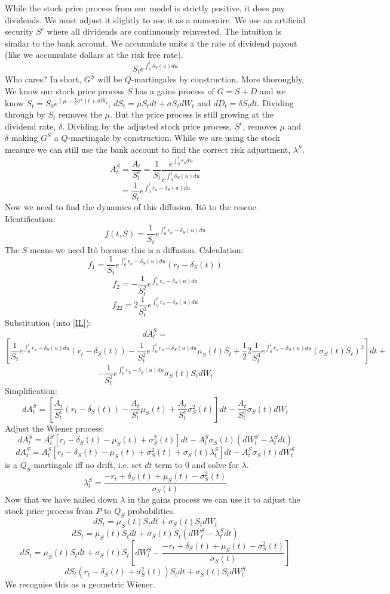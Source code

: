 While the stock price process from our model is strictly positive, it does pay
dividends. We must adjust it slightly to use it as a numeraire. We use an
artificial security $S^c$ where all dividends are continuously reinvested. The
intuition is similar to the bank account. We accumulate units a the rate of
dividend payout (like we accumulate dollars at the risk free rate).
\begin{equation} \label{stockNumeraire}
  S_te^{\int_0^t\delta_S(u)du}
\end{equation}
Who cares? In short, $G^S$ will be $Q$-martingales by construction. More
thoroughly, We know our stock price process $S$ has a gains process of
$G=S+D$ and we know $S_t=S_0e^{\left(\mu-\frac{1}{2}\sigma^2\right) t+
\sigma W_t}$, $dS_t=\mu S_tdt+\sigma S_tdW_t$ and $dD_t=\delta S_tdt$.
Dividing through by $S_t$ removes the $\mu$. But the price process is still
growing at the dividend rate, $\delta$. Dividing by the adjusted stock price
process, $S^c$, removes $\mu$ and $\delta$ making $G^S$ a $Q$-martingale by
construction. 
While we are using the stock measure we can still use the bank account to find
the correct risk adjustment, $\lambda^S$.
\[
  A_t^S=\frac{A_t}{S_t^c}=\frac{1}{S_t}
  \frac{e^{\int_0^tr_udu}}{e^{\int_0^t\delta_S(u)du}}
\]
\[=\frac{1}{S_t}e^{\int_0^tr_u-\delta_S(u)du}\]
Now we need to find the dynamics of this diffusion, It\^o to the rescue.
Identification:
\[f(t,S)=\frac{1}{S_t}e^{\int_0^tr_u-\delta_S(u)du}\]
The $S$ means we need It\^o because this is a diffusion. Calculation:
\[f_1=\frac{1}{S_t}e^{\int_0^tr_u-\delta_S(u)du}(r_t-\delta_S(t))\]
\[f_2=-\frac{1}{S_t^2}e^{\int_0^tr_u-\delta_S(u)du}\]
\[f_{22}=2\frac{1}{S_t^3}e^{\int_0^tr_u-\delta_S(u)du}\]
Substitution (into \ref{IL}):
\[dA_t^S=\]
\[
  \left[ \frac{1}{S_t}e^{\int_0^tr_u-\delta_S(u)du}(r_t-\delta_S(t))-
  \frac{1}{S_t^2}e^{\int_0^tr_u-\delta_S(u)du}\mu_S(t)S_t+
  \frac{1}{2}2\frac{1}{S_t^3}e^{\int_0^tr_u-\delta_S(u)du}(\sigma_S(t)S_t)^2
  \right] dt+
\]
\[-\frac{1}{S_t^2}e^{\int_0^tr_u-\delta_S(u)du}\sigma_S(t)S_tdW_t\]
Simplification:
\[
  dA_t^S=\left[ \frac{A_t}{S_t^c}(r_t-\delta_S(t))-\frac{A_t}{S_t^c}\mu_S(t)+
  \frac{A_t}{S_t^c}\sigma_S^2(t) \right] dt-\frac{A_t}{S_t^c}\sigma_S(t)dW_t
\]
Adjust the Wiener process:
\[
  dA_t^S=A_t^S\left[ r_t-\delta_S(t)-\mu_S(t)+\sigma_S^2(t)\right] dt-
  A_t^S\sigma_S(t)\left( dW_t^S-\lambda_t^Sdt\right)
\]
\[
  dA_t^S=A_t^S\left[ r_t-\delta_S(t)-\mu_S(t)+\sigma_S^2(t)+
  \sigma_S(t)\lambda_t^S\right] dt-A_t^S\sigma_S(t)dW_t^S
\]
is a $Q_S$-martingale iff no drift, i.e. set $dt$ term to $0$ and solve for
$\lambda$.
\[\lambda_t^S=\frac{-r_t+\delta_S(t)+\mu_S(t)-\sigma_S^2(t)}{\sigma_S(t)}\]
Now that we have nailed down $\lambda$ in the gains process we can use it to
adjust the stock price process from $P$ to $Q_S$ probabilities.
\[dS_t=\mu_S(t)S_tdt+\sigma_S(t)S_tdW_t\]
\[dS_t=\mu_S(t)S_tdt+\sigma_S(t)S_t(dW_t^S-\lambda_t^Sdt)\]
\[
  dS_t=\mu_S(t)S_tdt+\sigma_S(t)S_t\left[ dW_t^S-
  \frac{-r_t+\delta_S(t)+\mu_S(t)-\sigma_S^2(t)}{\sigma_S(t)}\right]
\]
\[dS_t(r_t-\delta_S(t)+\sigma_S^2(t))S_tdt+\sigma_S(t)S_tdW_t^S\]
We recognise this as a geometric Wiener.
